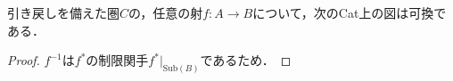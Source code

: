 \documentclass[uplatex, dvipdfmx]{jsarticle}
\begin{document}
\begin{corollary}\label{corollary-pullbackfunctor-and-inversmapping}
    引き戻しを備えた圏$C$の，任意の射$f:A\to B$について，次のCat上の図は可換である．
    \begin{center}
    \end{center}
\end{corollary}
\begin{proof}
    $f^{-1}$は$f^*$の制限関手$f^*|_{\mathrm{Sub}(B)}$であるため．
\end{proof}
\end{document}
